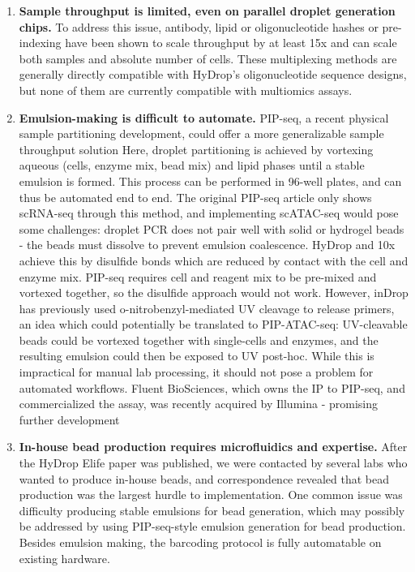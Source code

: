 \begin{enumerate}[noitemsep]
	\item \textbf{Sample throughput is limited, even on parallel droplet generation chips.} To address this issue, antibody, lipid or oligonucleotide hashes or pre-indexing have been shown to scale throughput by at least 15x and can scale both samples and absolute number of cells. These multiplexing methods are generally directly compatible with HyDrop's oligonucleotide sequence designs, but none of them are currently compatible with multiomics assays.
	\item \textbf{Emulsion-making is difficult to automate.} PIP-seq, a recent physical sample partitioning development, could offer a more generalizable sample throughput solution Here, droplet partitioning is achieved by vortexing aqueous (cells, enzyme mix, bead mix) and lipid phases until a stable emulsion is formed. This process can be performed in 96-well plates, and can thus be automated end to end. The original PIP-seq article only shows scRNA-seq through this method, and implementing scATAC-seq would pose some challenges: droplet PCR does not pair well with solid or hydrogel beads - the beads must dissolve to prevent emulsion coalescence. HyDrop and 10x achieve this by disulfide bonds which are reduced by contact with the cell and enzyme mix. PIP-seq requires cell and reagent mix to be pre-mixed and vortexed together, so the disulfide approach would not work. However, inDrop has previously used o-nitrobenzyl-mediated UV cleavage to release primers, an idea which could potentially be translated to PIP-ATAC-seq: UV-cleavable beads could be vortexed together with single-cells and enzymes, and the resulting emulsion could then be exposed to UV post-hoc. While this is impractical for manual lab processing, it should not pose a problem for automated workflows. Fluent BioSciences, which owns the IP to PIP-seq, and commercialized the assay, was recently acquired by Illumina - promising further development
	\item \textbf{In-house bead production requires microfluidics and expertise.} After the HyDrop Elife paper was published, we were contacted by several labs who wanted to produce in-house beads, and correspondence revealed that bead production was the largest hurdle to implementation. One common issue was difficulty producing stable emulsions for bead generation, which may possibly be addressed by using PIP-seq-style emulsion generation for bead production. Besides emulsion making, the barcoding protocol is fully automatable on existing hardware.
\end{enumerate}

